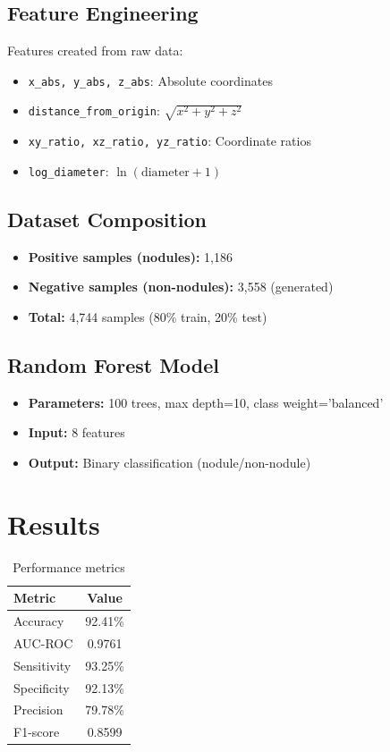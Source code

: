 \documentclass{article}
\begin{document}
\subsection{Feature Engineering}
Features created from raw data:
\begin{itemize}
    \item \texttt{x\_abs, y\_abs, z\_abs}: Absolute coordinates
    \item \texttt{distance\_from\_origin}: \(\sqrt{x^2 + y^2 + z^2}\)
    \item \texttt{xy\_ratio, xz\_ratio, yz\_ratio}: Coordinate ratios
    \item \texttt{log\_diameter}: \(\ln(\text{diameter} + 1)\)
\end{itemize}

\subsection{Dataset Composition}
\begin{itemize}
    \item \textbf{Positive samples (nodules):} 1,186
    \item \textbf{Negative samples (non-nodules):} 3,558 (generated)
    \item \textbf{Total:} 4,744 samples (80\% train, 20\% test)
\end{itemize}

\subsection{Random Forest Model}
\begin{itemize}
    \item \textbf{Parameters:} 100 trees, max depth=10, class weight='balanced'
    \item \textbf{Input:} 8 features
    \item \textbf{Output:} Binary classification (nodule/non-nodule)
\end{itemize}

\section{Results}

\begin{table}[H]
\centering
\begin{tabular}{@{}lc@{}}
\toprule
\textbf{Metric} & \textbf{Value} \\
\midrule
Accuracy & 92.41\% \\
AUC-ROC & 0.9761 \\
Sensitivity & 93.25\% \\
Specificity & 92.13\% \\
Precision & 79.78\% \\
F1-score & 0.8599 \\
\bottomrule
\end{tabular}
\caption{Performance metrics}
\label{tab:metrics}
\end{table}
\end{document}
